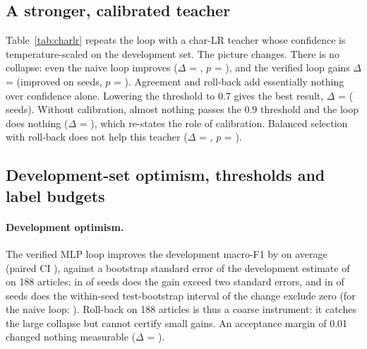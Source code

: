 \documentclass[11pt]{article}
\begin{document}
\begin{table}[t]
\centering\small
\caption{Verifier activity: candidates that passed the selection rule, disagreements with the verifier, and who was correct on the disagreements (counts summed over seeds).}\label{tab:verifier}

\end{table}
\begin{table}[t]
\centering\small
\caption{Error dependence between teacher and verifier on the test set (mean over seeds).}\label{tab:vercorr}
\resizebox{\textwidth}{!}{}
\end{table}

\subsection{A stronger, calibrated teacher}
Table~\ref{tab:charlr} repeats the loop with a char-LR teacher whose confidence is temperature-scaled on the development set. The picture changes. There is no collapse: even the naive loop improves ($\Delta$ = \cmpCharNaive, $p$ = \pCharNaive), and the verified loop gains $\Delta$ = \cmpCharVerified (improved on \nimpCharVerified{} seeds, $p$ = \pCharVerified). Agreement and roll-back add essentially nothing over confidence alone. Lowering the threshold to 0.7 gives the best result, $\Delta$ = \cmpCharVerifiedThrZeroSeven (\nimpCharVerifiedThrZeroSeven{} seeds). Without calibration, almost nothing passes the 0.9 threshold and the loop does nothing ($\Delta$ = \cmpCharVerifiedUncal), which re-states the role of calibration. Balanced selection with roll-back does not help this teacher ($\Delta$ = \cmpCharBalancedRb, $p$ = \pCharBalancedRb).

\begin{table}[t]
\centering\small
\caption{Char-LR teacher with temperature-scaled confidence, 20 labels per class, \nSeeds{} paired seeds.}\label{tab:charlr}
\resizebox{\textwidth}{!}{}
\end{table}

\subsection{Development-set optimism, thresholds and label budgets}
\paragraph{Development optimism.} The verified MLP loop improves the development macro-F1 by \devGainVerified{} on average (paired CI \cmpDevVerified), against a bootstrap standard error of the development estimate of \devSeVerified{} on 188 articles; in \devGainGtTwoSe{} of \nSeeds{} seeds does the gain exceed two standard errors, and in \testCiExclVerified{} of \nSeeds{} seeds does the within-seed test-bootstrap interval of the change exclude zero (for the naive loop: \testCiExclNaive{}). Roll-back on 188 articles is thus a coarse instrument: it catches the large collapse but cannot certify small gains. An acceptance margin of 0.01 changed nothing measurable ($\Delta$ = \cmpMainVerifiedMargin).
\end{document}
